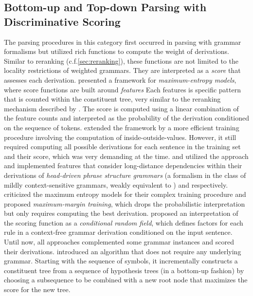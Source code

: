 \documentclass[../document.tex]{subfiles}
\begin{document}
    \subsection{Bottom-up and Top-down Parsing with Discriminative Scoring}\label{sec:literature:chart}
    The parsing procedures in this category first occurred in parsing with grammar formalisms but utilized rich functions to compute the weight of derivations.
    Similar to reranking (c.f.\@ \cref{sec:reranking}), these functions are not limited to the locality restrictions of weighted grammars.
    They are interpreted as a \emph{score} that assesses each derivation.
     presented a framework for \emph{maximum-entropy models}, where score functions are built around \emph{features}
    Each features is specific pattern that is counted within the constituent tree, very similar to the reranking mechanism described by \citet{collins2001convolution}.
    The score is computed using a linear combination of the feature counts and interpreted as the probability of the derivation conditioned on the sequence of tokens.
     extended the framework by a more efficient training procedure involving the computation of inside-outside-values.
    However, it still required computing all possible derivations for each sentence in the training set and their score, which was very demanding at the time.
     and \citet{Clark04a} utilized the approach and implemented features that consider long-distance dependencies within their derivations of \emph{head-driven phrase structure grammars} (a formalism in the class of mildly context-sensitive grammars, weakly equivalent to ) and  respectively.
     criticized the maximum entropy models for their complex training procedure and proposed \emph{maximum-margin training}, which drops the probabilistic interpretation but only requires computing the best derivation.
     proposed an interpretation of the scoring function as a \emph{conditional random field}, which defines factors for each rule in a context-free grammar derivation conditioned on the input sentence.
    Until now, all approaches complemented some grammar instances and scored their derivations.
     introduced an algorithm that does not require any underlying grammar.
    Starting with the sequence of  symbols, it incrementally constructs a constituent tree from a sequence of hypothesis trees (in a bottom-up fashion) by choosing a subsequence to be combined with a new root node that maximizes the score for the new tree.
\end{document}
